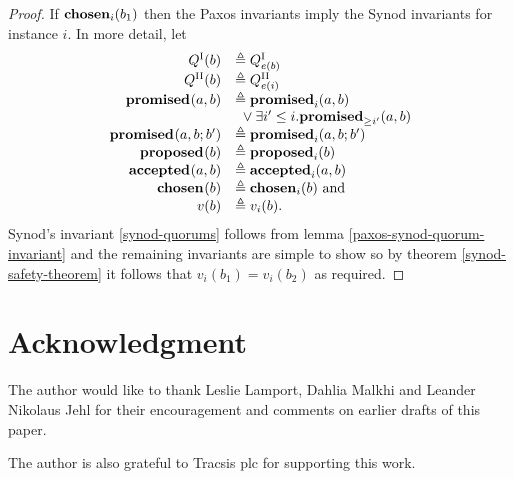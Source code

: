 \documentclass[journal]{IEEEtran}
\begin{document}
\begin{proof} If $\mathbf{chosen}_{i}(b_1)$ then the Paxos invariants imply the Synod
invariants for instance $i$.  In more detail, let
\[\begin{array}{rl}
Q^\textrm{I}(b) &\triangleq {Q}^\textrm{I}_{e(b)} \\
Q^\textrm{II}(b) &\triangleq {Q}^\textrm{II}_{e(i)} \\
\mathbf{promised}_{}(a,b) &\triangleq \mathbf{promised}_{i}(a,b) \\
& \ {}\vee \exists i' \le i. \mathbf{promised}_{\ge i'}(a,b) \\
\mathbf{promised}_{}(a,b;b') &\triangleq \mathbf{promised}_{i}(a,b;b') \\
\mathbf{proposed}_{}(b) &\triangleq \mathbf{proposed}_{i}(b) \\
\mathbf{accepted}_{}(a,b) &\triangleq \mathbf{accepted}_{i}(a,b) \\
\mathbf{chosen}_{}(b) &\triangleq \mathbf{chosen}_{i}(b) \textrm{ and} \\
v(b) &\triangleq v_i(b) .\\
\end{array}
\]
Synod's invariant \ref{synod-quorums} follows from lemma
\ref{paxos-synod-quorum-invariant} and the remaining invariants are simple to
show so by theorem \ref{synod-safety-theorem} it follows that $v_i(b_1) =
v_i(b_2)$ as required.  \end{proof}

\section*{Acknowledgment}

The author would like to thank Leslie Lamport, Dahlia Malkhi and Leander
Nikolaus Jehl for their encouragement and comments on earlier drafts of this
paper.

The author is also grateful to Tracsis plc for supporting this work.



\ifCLASSOPTIONcaptionsoff
  \newpage
\fi




\end{document}
